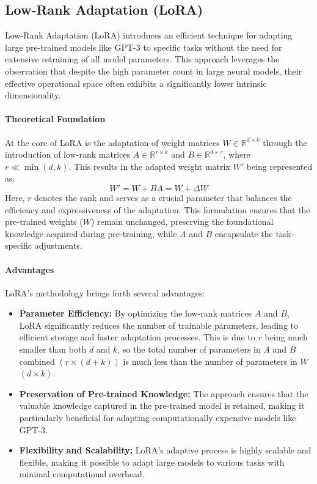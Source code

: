     \subsection{Low-Rank Adaptation (LoRA)}
        Low-Rank Adaptation (LoRA) introduces an efficient technique for adapting large pre-trained models like GPT-3 to specific tasks without the need for extensive retraining of all model parameters. This approach leverages the observation that despite the high parameter count in large neural models, their effective operational space often exhibits a significantly lower intrinsic dimensionality.

        \paragraph{Theoretical Foundation}
        At the core of LoRA is the adaptation of weight matrices \(W \in \mathbb{R}^{d \times k}\) through the introduction of low-rank matrices \(A \in \mathbb{R}^{r \times k}\) and \(B \in \mathbb{R}^{d \times r}\), where \(r \ll \min(d,k)\). This results in the adapted weight matrix \(W'\) being represented as:
        \begin{equation}
            W' = W + BA = W + \Delta W
        \end{equation}
        Here, \(r\) denotes the rank and serves as a crucial parameter that balances the efficiency and expressiveness of the adaptation. This formulation ensures that the pre-trained weights (\(W\)) remain unchanged, preserving the foundational knowledge acquired during pre-training, while \(A\) and \(B\) encapsulate the task-specific adjustments.

        \paragraph{Advantages}
        LoRA's methodology brings forth several advantages:
        \begin{itemize}
            \item \textbf{Parameter Efficiency:} By optimizing the low-rank matrices \(A\) and \(B\), LoRA significantly reduces the number of trainable parameters, leading to efficient storage and faster adaptation processes. This is due to \(r\) being much smaller than both \(d\) and \(k\), so the total number of parameters in \(A\) and \(B\) combined \((r \times (d + k))\) is much less than the number of parameters in \(W\) \((d \times k)\).
            \item \textbf{Preservation of Pre-trained Knowledge:} The approach ensures that the valuable knowledge captured in the pre-trained model is retained, making it particularly beneficial for adapting computationally expensive models like GPT-3.
            \item \textbf{Flexibility and Scalability:} LoRA's adaptive process is highly scalable and flexible, making it possible to adapt large models to various tasks with minimal computational overhead.
        \end{itemize}

